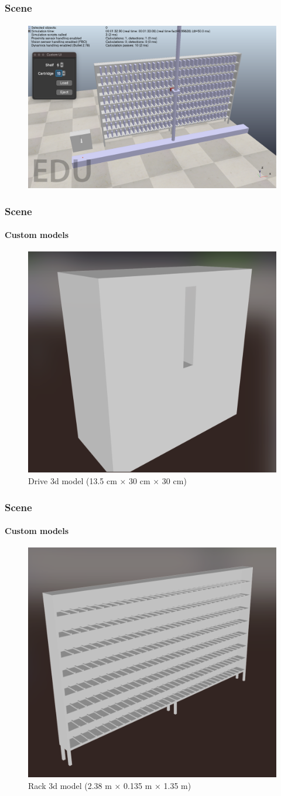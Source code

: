 \documentclass[12pt]{beamer}
\begin{document}
\begin{frame}
\frametitle{Scene}
\framesubtitle{}
\begin{figure}
    \centering
    \includegraphics[height=.8\textheight, trim={0 0 0 0}, clip]{img/scene.png}
    \label{fig:coppelia_scene}
\end{figure}
\end{frame}

\begin{frame}
\frametitle{Scene}
\framesubtitle{Custom models}
\begin{figure}
    \centering
    \includegraphics[width=.4\textwidth, trim={0 0 0 0}, clip]{img/drive.png}
    \caption{Drive 3d model (13.5 cm × 30 cm × 30 cm)}
    \label{fig:model_drive}
\end{figure}
\end{frame}

\begin{frame}
\frametitle{Scene}
\framesubtitle{Custom models}
\begin{figure}
    \centering
    \includegraphics[width=.5\textwidth, trim={0 0 0 0}, clip]{img/rack.png}
    \caption{Rack 3d model (2.38 m × 0.135 m × 1.35 m)}
    \label{fig:model_rack}
\end{figure}
\end{frame}
\end{document}
